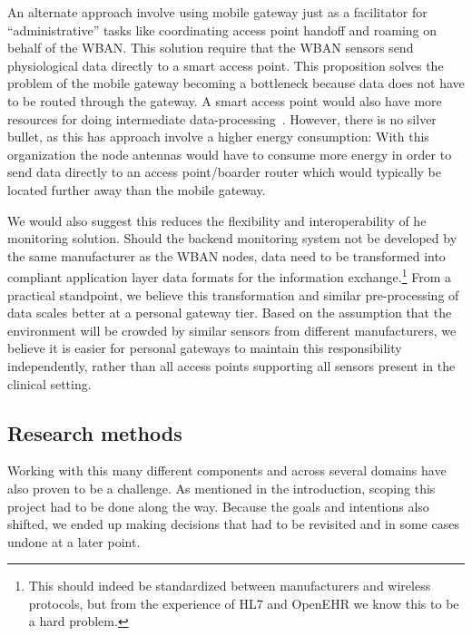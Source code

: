 An alternate approach involve using mobile gateway just as a facilitator for ``administrative'' tasks like coordinating access point handoff and roaming on behalf of the WBAN. This solution require that the WBAN sensors send physiological data directly to a smart access point. This proposition solves the problem of the mobile gateway becoming a bottleneck because data does not have to be routed through the gateway. A smart access point would also have more resources for doing intermediate data-processing~\cite{DrAmirMohammadRahmani:2014vx}. However, there is no silver bullet, as this has approach involve a higher energy consumption: With this organization the node antennas would have to consume more energy in order to send data directly to an access point/boarder router which would typically be located further away than the mobile gateway. 

We would also suggest this reduces the flexibility and interoperability of he monitoring solution. Should the backend monitoring system not be developed by the same manufacturer as the WBAN nodes, data need to be transformed into compliant application layer data formats for the information exchange.\footnote{ This should indeed be standardized between manufacturers and wireless protocols, but from the experience of HL7 and OpenEHR we know this to be a hard problem.} From a practical standpoint, we believe this transformation and similar pre-processing of data scales better at a personal gateway tier. Based on the assumption that the environment will be crowded by similar sensors from different manufacturers, we believe it is easier for personal gateways to maintain this responsibility independently, rather than all access points supporting all sensors present in the clinical setting.


\subsection{Research methods} %
\label{ssub:research_methods}

Working with this many different components and across several domains have also proven to be a challenge. As mentioned in the introduction, scoping this project had to be done along the way. Because the goals and intentions also shifted, we ended up making decisions that had to be revisited and in some cases undone at a later point.

